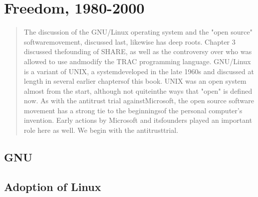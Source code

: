 \chapter{Freedom, 1980-2000}
\begin{quotation}
The discussion of the GNU/Linux 
operating system and the "open source" softwaremovement, discussed last, 
likewise has deep roots. Chapter 3 discussed thefounding of SHARE, as well as 
the controversy over who was allowed to use andmodify the TRAC programming 
language. GNU/Linux is a variant of UNIX, a systemdeveloped in the late 1960s 
and discussed at length in several earlier chaptersof this book. UNIX was an 
open system almost from the start, although not quiteinthe ways that "open" is 
defined now. As with the antitrust trial againstMicrosoft, the open source 
software movement has a strong tie to the beginningsof the personal computer's 
invention. Early actions by Microsoft and itsfounders played an important role 
here as well. We begin with the 
antitrusttrial.\cite{history_of_modern_computing_2003_ceruzzi}
\end{quotation}
\section{GNU}
\section{Adoption of Linux}
